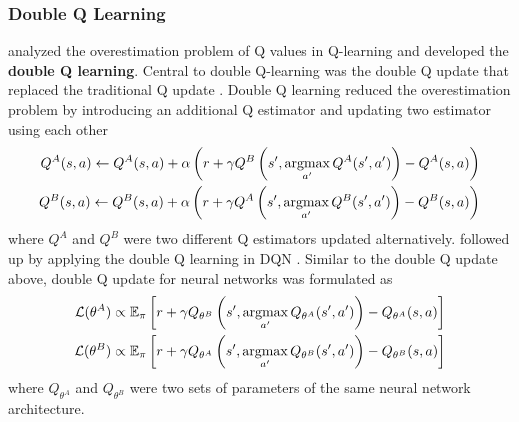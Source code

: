 \subsubsection{Double Q Learning}
\citeauthor{DoubleQlearning_Hasselt_2010} analyzed the overestimation problem of Q values in Q-learning and developed the \textbf{double Q learning}.
Central to double Q-learning was the double Q update that replaced the traditional Q update \cite{DoubleQlearning_Hasselt_2010}.
Double Q learning reduced the overestimation problem by introducing an additional Q estimator and updating two estimator using each other
\begin{align*}
    Q^{A}(s, a) \leftarrow Q^{A}(s, a)+ \alpha \left(r+\gamma Q^{B}\left(s', \operatorname*{argmax}_{a'}{Q^A(s', a')}\right)-Q^{A}(s, a)\right)  \\
    Q^{B}(s, a) \leftarrow Q^{B}(s, a)+ \alpha \left(r+\gamma Q^{A}\left(s', \operatorname*{argmax}_{a'}{Q^B(s', a')}\right)-Q^{B}(s, a)\right)
\end{align*}
where $Q^A$ and $Q^B$ were two different Q estimators updated alternatively.
\citeauthor{DeepReinforcementLearning_Hasselt.Guez.ea_2016} followed up by applying the double Q learning in DQN \cite{DeepReinforcementLearning_Hasselt.Guez.ea_2016}.
Similar to the double Q update above, double Q update for neural networks was formulated as
\begin{align*}
    \mathcal{L}(\theta^A)  & \propto \mathbb{E}_\pi \left[ r + \gamma Q_{\theta^B}\left(s', \operatorname*{argmax}_{a'}{Q_{\theta^A}(s', a')} \right) - Q_{\theta^A}(s, a) \right]  \\
    \mathcal{L}(\theta^B)  & \propto \mathbb{E}_\pi \left[ r + \gamma Q_{\theta^A}\left(s', \operatorname*{argmax}_{a'}{Q_{\theta^B}(s', a')} \right) - Q_{\theta^B}(s, a) \right]  \\
\end{align*}
where $Q_{\theta^A}$ and $Q_{\theta^B}$ were two sets of parameters of the same neural network architecture.

